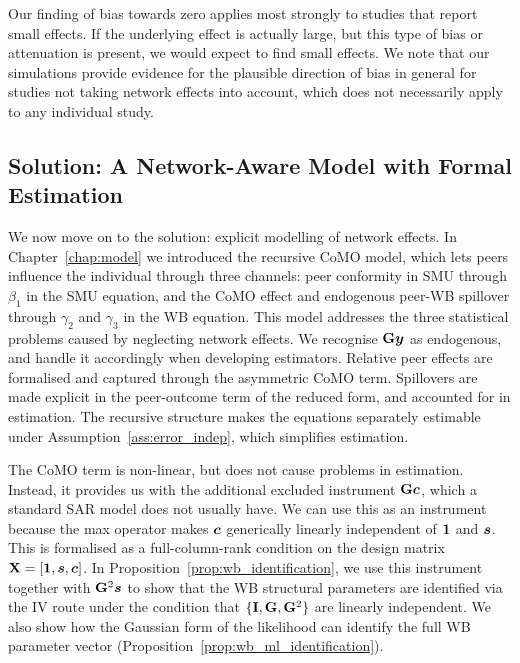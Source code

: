 Our finding of bias towards zero applies most strongly to studies that report small effects. If the underlying effect is actually large, but this type of bias or attenuation is present, we would expect to find small effects. We note that our simulations provide evidence for the plausible direction of bias in general for studies not taking network effects into account, which does not necessarily apply to any individual study.

\subsection{Solution: A Network-Aware Model with Formal Estimation}

We now move on to the solution: explicit modelling of network effects. In Chapter~\ref{chap:model} we introduced the recursive CoMO model, which lets peers influence the individual through three channels: peer conformity in SMU through $\beta_1$ in the SMU equation, and the CoMO effect and endogenous peer-WB spillover through $\gamma_2$ and $\gamma_3$ in the WB equation. This model addresses the three statistical problems caused by neglecting network effects. We recognise $\mathbf{G}\bm{y}$ as endogenous, and handle it accordingly when developing estimators. Relative peer effects are formalised and captured through the asymmetric CoMO term. Spillovers are made explicit in the peer-outcome term of the reduced form, and accounted for in estimation. The recursive structure makes the equations separately estimable under Assumption~\ref{ass:error_indep}, which simplifies estimation.

The CoMO term is non-linear, but does not cause problems in estimation. Instead, it provides us with the additional excluded instrument $\mathbf{G}\bm{c}$, which a standard SAR model does not usually have. We can use this as an instrument because the max operator makes $\bm{c}$ generically linearly independent of $\bm{1}$ and $\bm{s}$. This is formalised as a full-column-rank condition on the design matrix $\mathbf{X} = [\bm{1}, \bm{s}, \bm{c}]$. In Proposition~\ref{prop:wb_identification}, we use this instrument together with $\mathbf{G}^2\bm{s}$ to show that the WB structural parameters are identified via the IV route under the \textcite[Prop.~1]{Bramoulle2009} condition that $\{\mathbf{I}, \mathbf{G}, \mathbf{G}^2\}$ are linearly independent. We also show how the Gaussian form of the likelihood can identify the full WB parameter vector (Proposition~\ref{prop:wb_ml_identification}).

